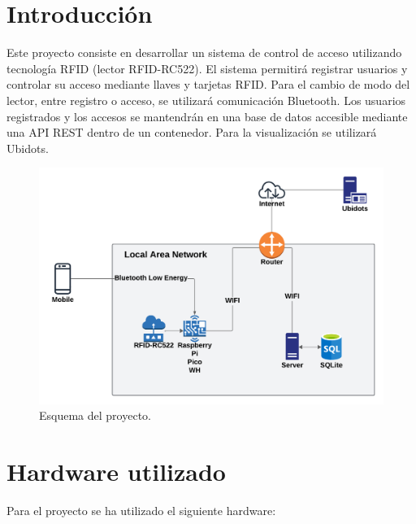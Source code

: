 \documentclass{article}
\begin{document}
\tableofcontents

\newpage


\section{Introducción}

Este proyecto consiste en desarrollar un sistema de control de acceso utilizando tecnología RFID (lector RFID-RC522).
El sistema permitirá registrar usuarios y controlar su acceso mediante llaves y tarjetas RFID. Para el cambio de modo del lector, entre registro o acceso, se utilizará comunicación Bluetooth. Los usuarios registrados y los accesos se mantendrán en una base de datos accesible mediante una API REST dentro de un contenedor. Para la visualización se utilizará Ubidots.

\begin{figure}[H]
\centering
\includegraphics[width=0.9\linewidth]{../images/esquema_proyecto.png}
\caption{\label{fig:esquema red}Esquema del proyecto.}
\end{figure}

\section{Hardware utilizado}
Para el proyecto se ha utilizado el siguiente hardware:
\end{document}

